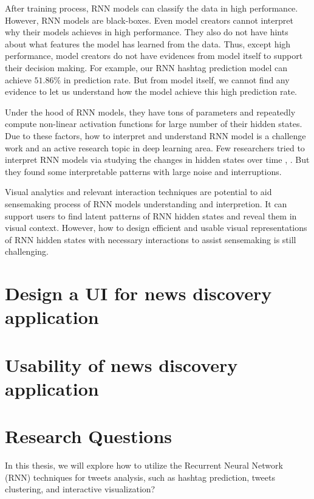 After training process, RNN models can classify the data in high performance. However, RNN models are black-boxes. Even model creators cannot interpret why their models achieves in high performance. They also do not have hints about what features the model has learned from the data. Thus, except high performance, model creators do not have evidences from model itself to support their decision making.  For example, our RNN hashtag prediction model can achieve $51.86\%$ in prediction rate. But from model itself, we cannot find any evidence to let us understand how the model achieve this high prediction rate. 

Under the hood of RNN models, they have tons of parameters and repeatedly compute non-linear activation functions for large number of their hidden states. Due to these factors, how to interpret and understand RNN model is a challenge work and an active research topic in deep learning area. Few researchers tried to interpret RNN models via studying the changes in hidden states over time \cite{Strobelt2016} \cite{Li2016}, . But they found some interpretable patterns with large noise and interruptions. 

Visual analytics and relevant interaction techniques are potential to aid sensemaking process \cite{Pirolli2005} of RNN models understanding and interpretion. It can support users to find latent patterns of RNN hidden states and reveal them in visual context. However, how to design efficient and usable visual representations of RNN hidden states with necessary interactions to assist sensemaking is still challenging.


\section{Design a UI for news discovery application}

\section{Usability of news discovery application}

\section{Research Questions}

In this thesis, we will explore how to utilize the Recurrent Neural Network (RNN) techniques for tweets analysis, such as hashtag prediction, tweets clustering, and interactive visualization?



